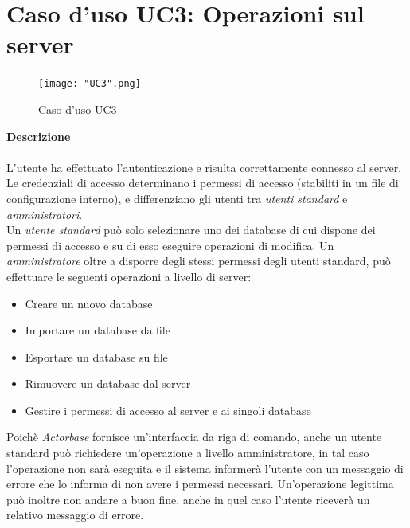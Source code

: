 \documentclass[a4paper]{report}
\begin{document}
	 \section{Caso d'uso UC3: Operazioni sul server}
	 	\begin{figure}[H]
			\centering
			\texttt{[image: "UC3".png]}
			\caption{Caso d'uso UC3}
		\end{figure}
	 \textbf{Descrizione} \\ \\
	 L'utente ha effettuato l'autenticazione e risulta correttamente connesso al server. Le credenziali di
	 accesso determinano i permessi di accesso (stabiliti in un file di configurazione interno), e differenziano
	 gli utenti tra \emph{utenti standard} e \emph{amministratori}. \\
	 Un \emph{utente standard} può solo selezionare uno dei database di cui dispone dei permessi di
	  accesso e su di esso eseguire operazioni di modifica.
	 Un \emph{amministratore} oltre a disporre degli stessi permessi degli utenti standard, può effettuare
	 le seguenti operazioni a livello di server:
	 \begin{itemize}
	 	\item Creare un nuovo database
	 	\item Importare un database da file
	 	\item Esportare un database su file
	 	\item Rimuovere un database dal server
	 	\item Gestire i permessi di accesso al server e ai singoli database
	 \end{itemize}
	 Poichè \emph{Actorbase} fornisce un'interfaccia da riga di comando, anche un utente standard può
	 richiedere un'operazione a livello amministratore, in tal caso l'operazione non sarà eseguita e il 
	 sistema informerà l'utente con un messaggio di errore che lo informa di non avere i permessi 
	 necessari. Un'operazione legittima può inoltre non andare a buon fine, anche in quel caso l'utente 
	 riceverà un relativo messaggio di errore.
\end{document}
